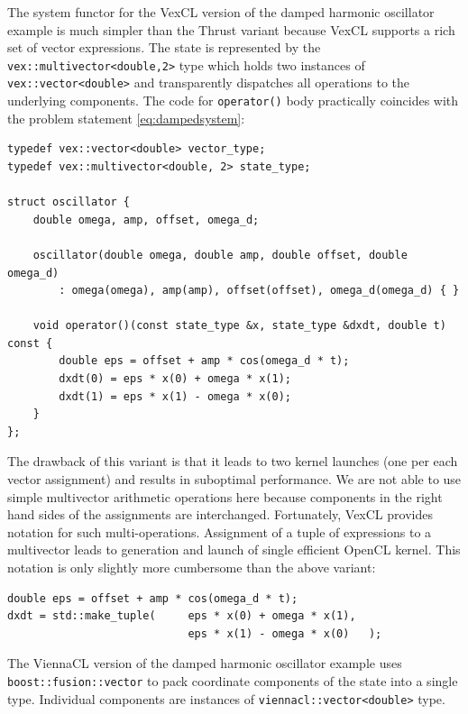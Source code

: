 \documentclass[1p]{elsarticle}
\newcommand{\code}[1]{\lstinline|#1|}
\begin{document}
The system functor for the VexCL version of the damped harmonic oscillator
example is much simpler than the Thrust variant because VexCL supports a rich
set of vector expressions. The state is represented by the
\code{vex::multivector<double,2>} type which holds two instances of
\code{vex::vector<double>} and transparently dispatches all operations to the
underlying components. The code for \code{operator()} body practically
coincides with the problem statement \eqref{eq:dampedsystem}: 
\begin{lstlisting}
typedef vex::vector<double> vector_type;
typedef vex::multivector<double, 2> state_type;

struct oscillator {
    double omega, amp, offset, omega_d;

    oscillator(double omega, double amp, double offset, double omega_d)
        : omega(omega), amp(amp), offset(offset), omega_d(omega_d) { }

    void operator()(const state_type &x, state_type &dxdt, double t) const {
        double eps = offset + amp * cos(omega_d * t);
        dxdt(0) = eps * x(0) + omega * x(1);
        dxdt(1) = eps * x(1) - omega * x(0);
    }
};
\end{lstlisting}


The drawback of this variant is that it leads
to two kernel launches (one per each vector assignment) and results in
suboptimal performance. We are not able to use simple multivector arithmetic
operations here because components in the right hand sides of the assignments
are interchanged.  Fortunately, VexCL provides notation for such
multi-operations.  Assignment of a tuple of expressions to a multivector leads
to generation and launch of single efficient OpenCL kernel. This notation is
only slightly more cumbersome than the above variant:
\begin{lstlisting}[firstnumber=11]
double eps = offset + amp * cos(omega_d * t);
dxdt = std::make_tuple(     eps * x(0) + omega * x(1),
                            eps * x(1) - omega * x(0)   );
\end{lstlisting}

The ViennaCL version of the damped harmonic oscillator example uses
\code{boost::fusion::vector} to pack coordinate components of the state into a
single type. Individual components are instances of
\code{viennacl::vector<double>} type.
\end{document}
